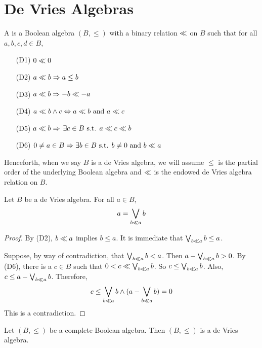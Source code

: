 \section{De Vries Algebras}
\label{devries}

\begin{definition}
	A  is a Boolean algebra \( (B,\leq) \) with a binary relation \( \mathord{\ll} \) on \( B \) such that for all \( a,b,c,d \in B \),
	\begin{enumerate}
		\item[(D1)] \( 0 \ll 0 \)
		\item[(D2)] \( a \ll b \Rightarrow a \leq b \)
		\item[(D3)] \( a \ll b \Rightarrow -b \ll -a \)
		\item[(D4)] \( a \ll b \wedge c \Leftrightarrow a \ll b \text{ and } a \ll c \)
		\item[(D5)] \( a \ll b \Rightarrow \) \( \exists c \in B \text{ s.t. } a \ll c \ll b \)
		\item[(D6)] \( 0 \neq a \in B \Rightarrow \exists b \in B \text{ s.t. } b \neq 0 \text{ and } b \ll a \)
	\end{enumerate}
	
	Henceforth, when we say \( B \) is a de Vries algebra, we will assume \( \leq \) is the partial order of the underlying Boolean algebra and \( \ll \) is the endowed de Vries algebra relation on \( B \).
\end{definition}

\begin{proposition}
	\label{devveeunder}
	Let \( B \) be a de Vries algebra.  For all \( a \in B \),
	\[ a = \bigvee_{b \ll a} b \]
\end{proposition}
\begin{proof}
	By (D2), \( b \ll a \) implies \( b \leq a \).  It is immediate that \( \bigvee_{b \ll a} b \leq a \).
	
	Suppose, by way of contradiction, that \( \bigvee_{b \ll a} b < a \).  Then \( a - \bigvee_{b \ll a} b > 0 \).  By (D6), there is a \( c \in B \) such that \( 0 < c \ll \bigvee_{b \ll a} b \).  So \( c \leq \bigvee_{b \ll a} b \).  Also, \( c \leq a - \bigvee_{b \ll a} b \).  Therefore,
	\[ c \leq \bigvee_{b \ll a} b \wedge (a - \bigvee_{b \ll a} b) = 0 \]
	This is a contradiction.
\end{proof}

\begin{example}
	Let \( (B,\leq) \) be a complete Boolean algebra.  Then \( (B,\leq) \) is a de Vries algebra.
\end{example}

